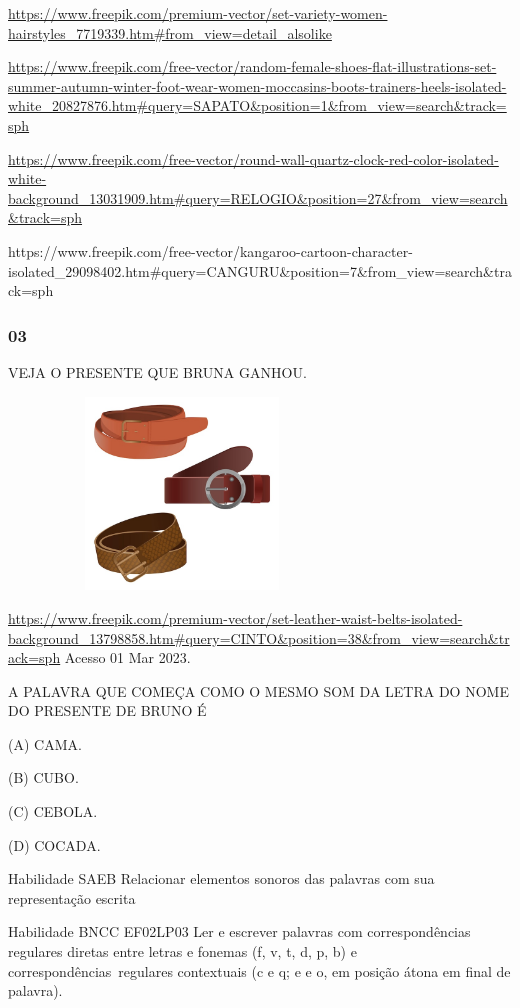 \url{https://www.freepik.com/premium-vector/set-variety-women-hairstyles_7719339.htm\#from_view=detail_alsolike}

\url{https://www.freepik.com/free-vector/random-female-shoes-flat-illustrations-set-summer-autumn-winter-foot-wear-women-moccasins-boots-trainers-heels-isolated-white_20827876.htm\#query=SAPATO\&position=1\&from_view=search\&track=sph}

\url{https://www.freepik.com/free-vector/round-wall-quartz-clock-red-color-isolated-white-background_13031909.htm\#query=RELOGIO\&position=27\&from_view=search\&track=sph}

https://www.freepik.com/free-vector/kangaroo-cartoon-character-isolated\_29098402.htm\#query=CANGURU\&position=7\&from\_view=search\&track=sph

\subsubsection{03}\label{section-14}

VEJA O PRESENTE QUE BRUNA GANHOU.

\includegraphics[width=3.62413in,height=2.01875in]{media/image48.jpeg}

\url{https://www.freepik.com/premium-vector/set-leather-waist-belts-isolated-background_13798858.htm\#query=CINTO\&position=38\&from_view=search\&track=sph}
Acesso 01 Mar 2023.

\protect\hypertarget{_Hlk129112871}{}{}A PALAVRA QUE COMEÇA COMO O MESMO
SOM DA LETRA DO NOME DO PRESENTE DE BRUNO É

(A) CAMA.

(B) CUBO.

(C) CEBOLA.

(D) COCADA.

\protect\hypertarget{_Hlk128577260}{}{}Habilidade SAEB Relacionar
elementos sonoros das palavras com sua representação escrita

\protect\hypertarget{_Hlk129112702}{}{}Habilidade BNCC EF02LP03 Ler e
escrever palavras com correspondências regulares diretas entre letras e
fonemas (f, v, t, d, p, b) e correspondências~regulares contextuais (c e
q; e e o, em posição átona em final de palavra).

